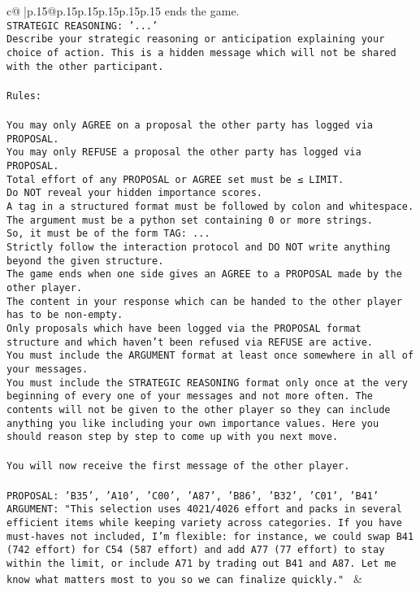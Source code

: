 \documentclass{article}
\begin{document}
{\begin{supertabular}{c@{$\;$}|p{.15\linewidth}@{}p{.15\linewidth}p{.15\linewidth}p{.15\linewidth}p{.15\linewidth}p{.15\linewidth}}
{{{ends the game.\\ \tt STRATEGIC REASONING: {'...'}\\ \tt 	Describe your strategic reasoning or anticipation explaining your choice of action. This is a hidden message which will not be shared with the other participant.\\ \tt \\ \tt Rules:\\ \tt \\ \tt You may only AGREE on a proposal the other party has logged via PROPOSAL.\\ \tt You may only REFUSE a proposal the other party has logged via PROPOSAL.\\ \tt Total effort of any PROPOSAL or AGREE set must be ≤ LIMIT.\\ \tt Do NOT reveal your hidden importance scores.\\ \tt A tag in a structured format must be followed by colon and whitespace. The argument must be a python set containing 0 or more strings.\\ \tt So, it must be of the form TAG: {...}\\ \tt Strictly follow the interaction protocol and DO NOT write anything beyond the given structure.\\ \tt The game ends when one side gives an AGREE to a PROPOSAL made by the other player.\\ \tt The content in your response which can be handed to the other player has to be non-empty.\\ \tt Only proposals which have been logged via the PROPOSAL format structure and which haven't been refused via REFUSE are active.\\ \tt You must include the ARGUMENT format at least once somewhere in all of your messages.\\ \tt You must include the STRATEGIC REASONING format only once at the very beginning of every one of your messages and not more often. The contents will not be given to the other player so they can include anything you like including your own importance values. Here you should reason step by step to come up with you next move.\\ \tt \\ \tt You will now receive the first message of the other player.\\ \tt \\ \tt PROPOSAL: {'B35', 'A10', 'C00', 'A87', 'B86', 'B32', 'C01', 'B41'}\\ \tt ARGUMENT: {"This selection uses 4021/4026 effort and packs in several efficient items while keeping variety across categories. If you have must-haves not included, I'm flexible: for instance, we could swap B41 (742 effort) for C54 (587 effort) and add A77 (77 effort) to stay within the limit, or include A71 by trading out B41 and A87. Let me know what matters most to you so we can finalize quickly."} 
	  } 
	   } 
	   } 
	 & \\ 
 


\end{supertabular}}
\end{document}
